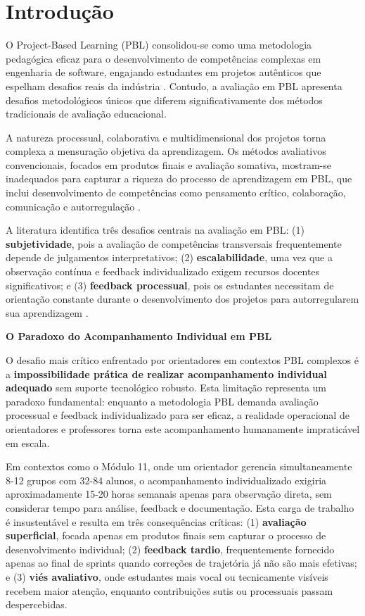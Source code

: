 \documentclass[english, spanish, brazilian]{RBIEarticle} %
\begin{document}

\section{Introdução}

O Project-Based Learning (PBL) consolidou-se como uma metodologia pedagógica eficaz para o desenvolvimento de competências complexas em engenharia de software, engajando estudantes em projetos autênticos que espelham desafios reais da indústria \parencite{Blumenfeld1991}. Contudo, a avaliação em PBL apresenta desafios metodológicos únicos que diferem significativamente dos métodos tradicionais de avaliação educacional.

A natureza processual, colaborativa e multidimensional dos projetos torna complexa a mensuração objetiva da aprendizagem. Os métodos avaliativos convencionais, focados em produtos finais e avaliação somativa, mostram-se inadequados para capturar a riqueza do processo de aprendizagem em PBL, que inclui desenvolvimento de competências como pensamento crítico, colaboração, comunicação e autorregulação \parencite{Frank2003}.

A literatura identifica três desafios centrais na avaliação em PBL: (1) \textbf{subjetividade}, pois a avaliação de competências transversais frequentemente depende de julgamentos interpretativos; (2) \textbf{escalabilidade}, uma vez que a observação contínua e feedback individualizado exigem recursos docentes significativos; e (3) \textbf{feedback processual}, pois os estudantes necessitam de orientação constante durante o desenvolvimento dos projetos para autorregularem sua aprendizagem \parencite{Savery2015}.

\textbf{O Paradoxo do Acompanhamento Individual em PBL}

O desafio mais crítico enfrentado por orientadores em contextos PBL complexos é a \textbf{impossibilidade prática de realizar acompanhamento individual adequado} sem suporte tecnológico robusto. Esta limitação representa um paradoxo fundamental: enquanto a metodologia PBL demanda avaliação processual e feedback individualizado para ser eficaz, a realidade operacional de orientadores e professores torna este acompanhamento humanamente impraticável em escala.

Em contextos como o Módulo 11, onde um orientador gerencia simultaneamente 8-12 grupos com 32-84 alunos, o acompanhamento individualizado exigiria aproximadamente 15-20 horas semanais apenas para observação direta, sem considerar tempo para análise, feedback e documentação. Esta carga de trabalho é insustentável e resulta em três consequências críticas: (1) \textbf{avaliação superficial}, focada apenas em produtos finais sem capturar o processo de desenvolvimento individual; (2) \textbf{feedback tardio}, frequentemente fornecido apenas ao final de sprints quando correções de trajetória já não são mais efetivas; e (3) \textbf{viés avaliativo}, onde estudantes mais vocal ou tecnicamente visíveis recebem maior atenção, enquanto contribuições sutis ou processuais passam despercebidas.
\end{document}
